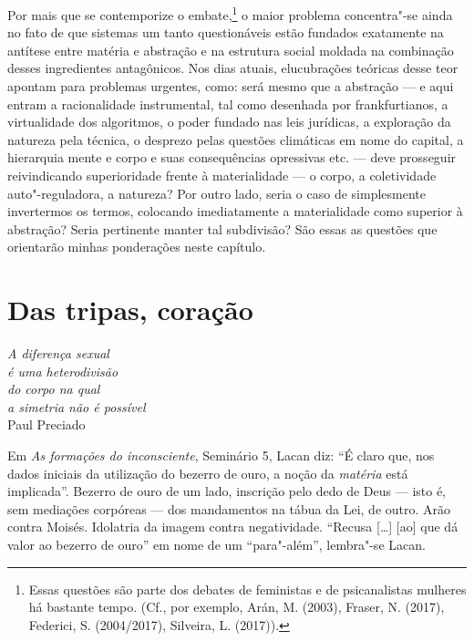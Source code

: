 Por mais que se contemporize o embate,\footnote{Essas questões são parte
  dos debates de feministas e de psicanalistas mulheres há bastante
  tempo. (Cf., por exemplo, Arán, M. (2003), Fraser, N. (2017),
  Federici, S. (2004/2017), Silveira, L. (2017)).} o maior problema
concentra"-se ainda no fato de que sistemas um tanto questionáveis estão
fundados exatamente na antítese entre matéria e abstração e na estrutura
social moldada na combinação desses ingredientes antagônicos. Nos dias
atuais, elucubrações teóricas desse teor apontam para problemas
urgentes, como: será mesmo que a abstração --- e aqui entram a
racionalidade instrumental, tal como desenhada por frankfurtianos, a
virtualidade dos algoritmos, o poder fundado nas leis jurídicas, a
exploração da natureza pela técnica, o desprezo pelas questões
climáticas em nome do capital, a hierarquia mente e corpo e suas
consequências opressivas etc. --- deve prosseguir reivindicando
superioridade frente à materialidade --- o corpo, a coletividade
auto"-reguladora, a natureza? Por outro lado, seria o caso de
simplesmente invertermos os termos, colocando imediatamente a
materialidade como superior à abstração? Seria pertinente manter tal
subdivisão? São essas as questões que orientarão minhas ponderações
neste capítulo.

\section{Das tripas, coração}

\begin{flushright}
\footnotesize
\emph{A diferença sexual\\
é uma heterodivisão\\
do corpo na qual\\
a simetria não é possível}\\
Paul Preciado
\end{flushright}

Em \emph{As formações do inconsciente}, Seminário 5, Lacan diz: ``É
claro que, nos dados iniciais da utilização do bezerro de ouro, a noção
da \emph{matéria} está implicada''. Bezerro de ouro de um lado,
inscrição pelo dedo de Deus --- isto é, sem mediações corpóreas --- dos
mandamentos na tábua da Lei, de outro. Arão contra Moisés. Idolatria da
imagem contra negatividade. ``Recusa {[}\ldots{}{]} {[}ao{]} que dá valor ao
bezerro de ouro'' em nome de um ``para"-além'', lembra"-se Lacan.

